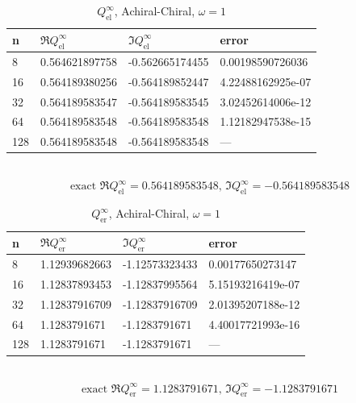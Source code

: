 \begin{table}
  \centering
  \renewcommand{\arraystretch}{1.1}
  \caption{$Q_\text{el}^\infty$, Achiral-Chiral, $\omega=1$}
  \begin{tabular}{@{}llll@{}}
    \toprule
    n & $\Re{Q_\text{el}^\infty}$ & $\Im{Q_\text{el}^\infty}$ & error \\
    \midrule
8 & 0.564621897758 & -0.562665174455 & 0.00198590726036\\ 
16 & 0.564189380256 & -0.564189852447 & 4.22488162925e-07\\ 
32 & 0.564189583547 & -0.564189583545 & 3.02452614006e-12\\ 
64 & 0.564189583548 & -0.564189583548 & 1.12182947538e-15\\ 
128 & 0.564189583548 & -0.564189583548 & ---\\ 
    \bottomrule
  \end{tabular}
  \\ 
  $$\text{exact }\Re{Q_\text{el}^\infty}=0.564189583548,\,\Im{Q_\text{el}^\infty}=-0.564189583548$$  
\end{table}

\begin{table}
  \centering
  \renewcommand{\arraystretch}{1.1}
  \caption{$Q_\text{er}^\infty$, Achiral-Chiral, $\omega=1$}
  \begin{tabular}{@{}llll@{}}
    \toprule
    n & $\Re{Q_\text{er}^\infty}$ & $\Im{Q_\text{er}^\infty}$ & error \\
    \midrule
8 & 1.12939682663 & -1.12573323433 & 0.00177650273147\\ 
16 & 1.12837893453 & -1.12837995564 & 5.15193216419e-07\\ 
32 & 1.12837916709 & -1.12837916709 & 2.01395207188e-12\\ 
64 & 1.1283791671 & -1.1283791671 & 4.40017721993e-16\\ 
128 & 1.1283791671 & -1.1283791671 & ---\\ 
    \bottomrule
  \end{tabular}
  \\ 
  $$\text{exact }\Re{Q_\text{er}^\infty}=1.1283791671,\,\Im{Q_\text{er}^\infty}=-1.1283791671$$  
\end{table}

